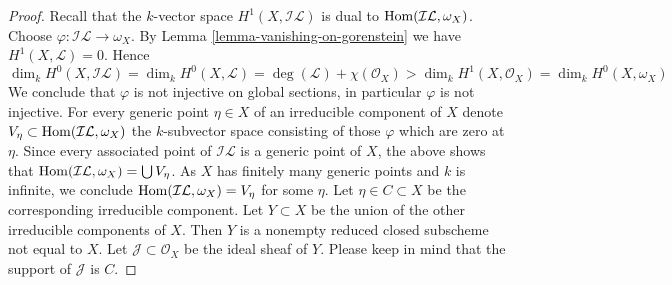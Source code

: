 \begin{proof}
\medskip\noindent
Recall that the $k$-vector space $H^1(X, \mathcal{I}\mathcal{L})$
is dual to $\mathop{\mathrm{Hom}}\nolimits(\mathcal{I}\mathcal{L}, \omega_X)$.
Choose $\varphi : \mathcal{I}\mathcal{L} \to \omega_X$.
By Lemma \ref{lemma-vanishing-on-gorenstein} we have
$H^1(X, \mathcal{L}) = 0$. Hence
$$
\dim_k H^0(X, \mathcal{I}\mathcal{L}) = \dim_k H^0(X, \mathcal{L}) =
\deg(\mathcal{L}) + \chi(\mathcal{O}_X) > \dim_k H^1(X, \mathcal{O}_X) =
\dim_k H^0(X, \omega_X)
$$
We conclude that $\varphi$ is not injective on global sections, in particular
$\varphi$ is not injective. For every generic point $\eta \in X$
of an irreducible component of $X$ denote
$V_\eta \subset \mathop{\mathrm{Hom}}\nolimits(\mathcal{I}\mathcal{L}, \omega_X)$ the $k$-subvector
space consisting of those $\varphi$ which are zero at $\eta$.
Since every associated point of $\mathcal{I}\mathcal{L}$
is a generic point of $X$, the above shows that
$\mathop{\mathrm{Hom}}\nolimits(\mathcal{I}\mathcal{L}, \omega_X) = \bigcup V_\eta$.
As $X$ has finitely many generic points and $k$ is infinite, we conclude
$\mathop{\mathrm{Hom}}\nolimits(\mathcal{I}\mathcal{L}, \omega_X) = V_\eta$ for some $\eta$.
Let $\eta \in C \subset X$ be the corresponding irreducible component.
Let $Y \subset X$ be the union of the other irreducible components
of $X$. Then $Y$ is a nonempty reduced closed subscheme not equal to $X$.
Let $\mathcal{J} \subset \mathcal{O}_X$ be the ideal sheaf of $Y$.
Please keep in mind that the support of $\mathcal{J}$ is $C$.


\end{proof}
